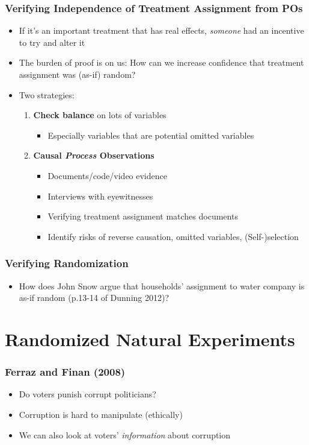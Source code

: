 \documentclass[xcolor=x11names,compress]{beamer}\usepackage[]{graphicx}\usepackage[]{color}
\renewcommand{\(}{\begin{columns}}
\renewcommand{\)}{\end{columns}}
\newcommand{\<}[1]{\begin{column}{#1}}
\renewcommand{\>}{\end{column}}
\begin{document}
\begin{frame}
\frametitle{Verifying Independence of Treatment Assignment from POs}
\begin{itemize}
\item If it's an important treatment that has real effects, \textit{someone} had an incentive to try and alter it
\pause
\item The burden of proof is on us: How can we increase confidence that treatment assignment was (as-if) random?
\pause
\item Two strategies:
\pause
\begin{enumerate}
\item \textbf{Check balance} on lots of variables
\begin{itemize}
\item Especially variables that are potential omitted variables
\end{itemize}
\pause
\item \textbf{Causal \textit{Process} Observations}
\pause
\begin{itemize}
\item Documents/code/video evidence
\pause
\item Interviews with eyewitnesses
\pause
\item Verifying treatment assignment matches documents
\pause
\item Identify risks of reverse causation, omitted variables, (Self-)selection
\end{itemize}
\end{enumerate}
\end{itemize}
\end{frame}

\begin{frame}
\frametitle{Verifying Randomization}
\begin{itemize}
\item How does John Snow argue that households' assignment to water company is as-if random (p.13-14 of Dunning 2012)?
\end{itemize}
\end{frame}



\section{Randomized Natural Experiments}

\begin{frame}
\frametitle{Ferraz and Finan (2008)}
\begin{itemize}
\item Do voters punish corrupt politicians?
\pause
\item Corruption is hard to manipulate (ethically)
\pause
\item We can also look at voters' \textit{information} about corruption 
\end{itemize}
\end{frame}
\end{document}
